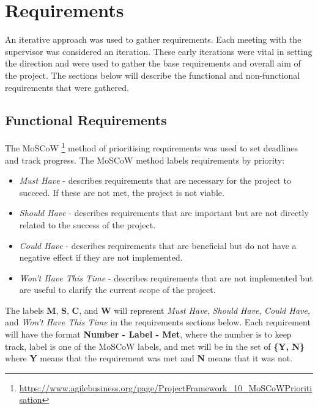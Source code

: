 \documentclass{l4proj}
\begin{document}
\section{Requirements}
An iterative approach was used to gather requirements. Each meeting with the supervisor was considered an iteration. These early iterations were vital in setting the direction and were used to gather the base requirements and overall aim of the project. The sections below will describe the functional and non-functional requirements that were gathered. %

\subsection{Functional Requirements}
The MoSCoW \footnote{\url{https://www.agilebusiness.org/page/ProjectFramework_10_MoSCoWPrioritisation}} method of prioritising requirements was used to set deadlines and track progress. The MoSCoW method labels requirements by priority: 
\begin{itemize}
    \item \textit{Must Have} - describes requirements that are necessary for the project to succeed. If these are not met, the project is not viable.
    \item \textit{Should Have} - describes requirements that are important but are not directly related to the success of the project.
    \item \textit{Could Have} - describes requirements that are beneficial but do not have a negative effect if they are not implemented.
    \item \textit{Won't Have This Time} - describes requirements that are not implemented but are useful to clarify the current scope of the project.
\end{itemize}
The labels \textbf{M}, \textbf{S}, \textbf{C}, and \textbf{W} will represent \textit{Must Have}, \textit{Should Have}, \textit{Could Have}, and \textit{Won't Have This Time} in the requirements sections below. Each requirement will have the format \textbf{Number - Label - Met}, where the number is to keep track, label is one of the MoSCoW labels, and met will be in the set of \textbf{\{Y, N\}} where \textbf{Y} means that the requirement was met and \textbf{N} means that it was not.
\end{document}
